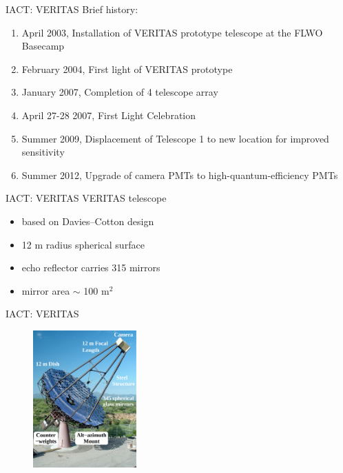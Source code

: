 \documentclass{beamer}
\begin{document}
\begin{frame}{IACT: VERITAS}
    Brief history:
    \begin{enumerate}
        \item April 2003, Installation of VERITAS prototype telescope at the FLWO Basecamp
        \item February 2004, First light of VERITAS prototype
        \item January 2007, Completion of 4 telescope array
        \item April 27-28 2007, First Light Celebration
        \item Summer 2009, Displacement of Telescope 1 to new location for improved sensitivity
        \item Summer 2012, Upgrade of camera PMTs to high-quantum-efficiency PMTs
    \end{enumerate}
\end{frame}


\begin{frame}{IACT: VERITAS}
    VERITAS telescope
    \begin{itemize}
        \item based on Davies–Cotton design
        \item 12 m radius spherical surface
        \item echo reflector carries 315 mirrors
        \item mirror area $\sim$ 100 $ \text{m}^2$
    \end{itemize}
\end{frame}


\begin{frame}{IACT: VERITAS}
    \begin{figure}[h]
        \includegraphics[width=150px]{VERITAS_telescope.png}
    \end{figure}
\end{frame}
\end{document}
